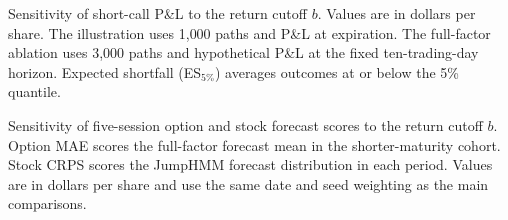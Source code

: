 \begin{table}[H]
\centering
\caption{Sensitivity of short-call P\&L to the return cutoff $b$. Values are in dollars per share. The illustration uses 1{,}000 paths and P\&L at expiration. The full-factor ablation uses 3{,}000 paths and hypothetical P\&L at the fixed ten-trading-day horizon. Expected shortfall (ES$_{5\%}$) averages outcomes at or below the 5\% quantile.}\label{tab:tail_sensitivity}

\end{table}

\begin{table}[H]
\centering
\caption{Sensitivity of five-session option and stock forecast scores to the return cutoff $b$. Option MAE scores the full-factor forecast mean in the shorter-maturity cohort. Stock CRPS scores the JumpHMM forecast distribution in each period. Values are in dollars per share and use the same date and seed weighting as the main comparisons.}\label{tab:tail_forecasts}

\end{table}
\FloatBarrier
